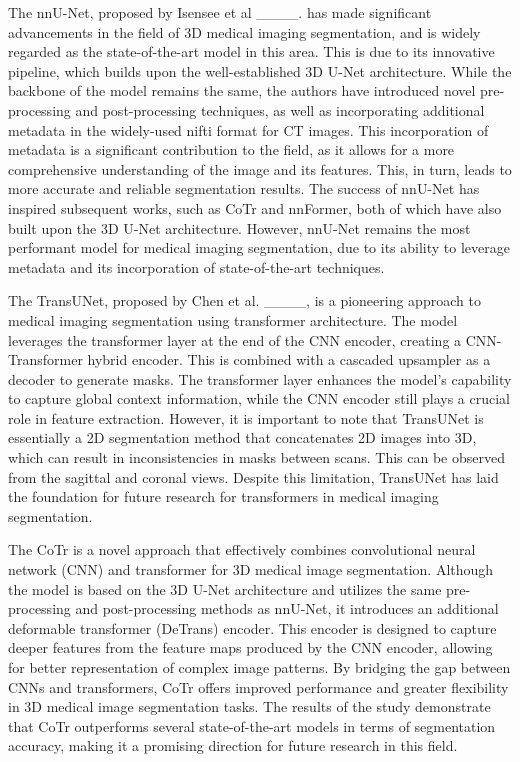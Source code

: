 The nnU-Net, proposed by Isensee et al ____. has made significant advancements in the field of 3D medical imaging segmentation, and is widely regarded as the state-of-the-art model in this area. This is due to its innovative pipeline, which builds upon the well-established 3D U-Net architecture. While the backbone of the model remains the same, the authors have introduced novel pre-processing and post-processing techniques, as well as incorporating additional metadata in the widely-used nifti format for CT images. This incorporation of metadata is a significant contribution to the field, as it allows for a more comprehensive understanding of the image and its features. This, in turn, leads to more accurate and reliable segmentation results. The success of nnU-Net has inspired subsequent works, such as CoTr and nnFormer, both of which have also built upon the 3D U-Net architecture. However, nnU-Net remains the most performant model for medical imaging segmentation, due to its ability to leverage metadata and its incorporation of state-of-the-art techniques.


The TransUNet, proposed by Chen et al. ____, is a pioneering approach to medical imaging segmentation using transformer architecture. The model leverages the transformer layer at the end of the CNN encoder, creating a CNN-Transformer hybrid encoder. This is combined with a cascaded upsampler as a decoder to generate masks. The transformer layer enhances the model's capability to capture global context information, while the CNN encoder still plays a crucial role in feature extraction. However, it is important to note that TransUNet is essentially a 2D segmentation method that concatenates 2D images into 3D, which can result in inconsistencies in masks between scans. This can be observed from the sagittal and coronal views. Despite this limitation, TransUNet has laid the foundation for future research for transformers in medical imaging segmentation.



The CoTr is a novel approach that effectively combines convolutional neural network (CNN) and transformer for 3D medical image segmentation. Although the model is based on the 3D U-Net architecture and utilizes the same pre-processing and post-processing methods as nnU-Net, it introduces an additional deformable transformer (DeTrans) encoder. This encoder is designed to capture deeper features from the feature maps produced by the CNN encoder, allowing for better representation of complex image patterns. By bridging the gap between CNNs and transformers, CoTr offers improved performance and greater flexibility in 3D medical image segmentation tasks. The results of the study demonstrate that CoTr outperforms several state-of-the-art models in terms of segmentation accuracy, making it a promising direction for future research in this field.

